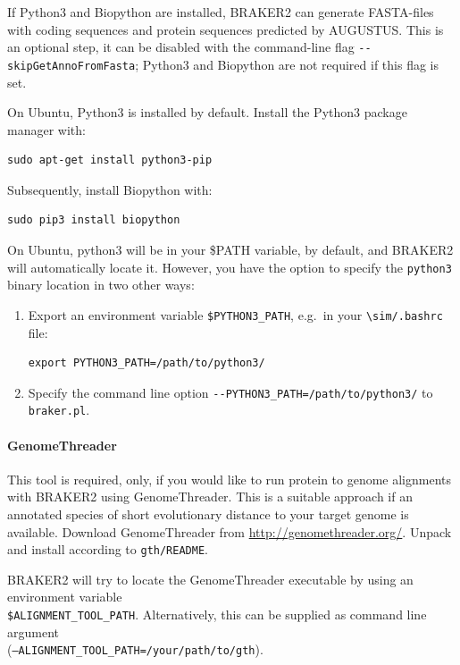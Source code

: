\documentclass[]{article}
\let\oldparagraph\paragraph
\renewcommand{\paragraph}[1]{\oldparagraph{#1}\mbox{}}
\begin{document}
If Python3 and Biopython are installed, BRAKER2 can generate FASTA-files
with coding sequences and protein sequences predicted by AUGUSTUS. This
is an optional step, it can be disabled with the command-line flag
\texttt{-\/-skipGetAnnoFromFasta}; Python3 and Biopython are not
required if this flag is set.

On Ubuntu, Python3 is installed by default. Install the Python3 package
manager with:

\begin{verbatim}
sudo apt-get install python3-pip
\end{verbatim}

Subsequently, install Biopython with:

\begin{verbatim}
sudo pip3 install biopython
\end{verbatim}

On Ubuntu, python3 will be in your \$PATH variable, by default, and
BRAKER2 will automatically locate it. However, you have the option to
specify the \texttt{python3} binary location in two other ways:

\begin{enumerate}
\def\labelenumi{\arabic{enumi}.}
\item
  Export an environment variable \texttt{\$PYTHON3\_PATH}, e.g.~in your
  \texttt{\textbackslash{}sim/.bashrc} file:

\begin{verbatim}
export PYTHON3_PATH=/path/to/python3/
\end{verbatim}
\item
  Specify the command line option
  \texttt{-\/-PYTHON3\_PATH=/path/to/python3/} to \texttt{braker.pl}.
\end{enumerate}

\paragraph{GenomeThreader}\label{genomethreader}

This tool is required, only, if you would like to run protein to genome
alignments with BRAKER2 using GenomeThreader. This is a suitable
approach if an annotated species of short evolutionary distance to your
target genome is available. Download GenomeThreader from
\url{http://genomethreader.org/}. Unpack and install according to
\texttt{gth/README}.

BRAKER2 will try to locate the GenomeThreader executable by using an
environment variable\\
\texttt{\$ALIGNMENT\_TOOL\_PATH}. Alternatively, this can be supplied as
command line argument\\
(\texttt{–ALIGNMENT\_TOOL\_PATH=/your/path/to/gth}).
\end{document}
